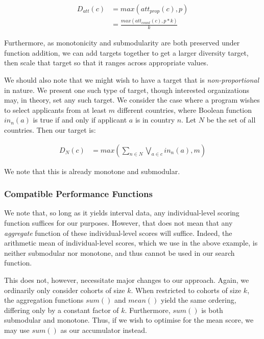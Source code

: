 \begin{equation}
    \begin{split}
        D_{att}(c) &= max(att_{prop}(c), p) \\
        &= \frac{max(att_{count}(c), p*k)}{k}
    \end{split}
\end{equation}

Furthermore, as monotonicity and submodularity are both preserved under function addition, we can add targets together to get a larger diversity target, then scale that target so that it ranges across appropriate values.

We should also note that we might wish to have a target that is \textit{non-proportional} in nature. We present one such type of target, though interested organizations may, in theory, set any such target. We consider the case where a program wishes to select applicants from at least $m$ different countries, where Boolean function $in_n(a)$ is true if and only if applicant $a$ is in country $n$. Let $N$ be the set of all countries. Then our target is:

\begin{equation}
    \begin{split}
        D_N(c) &= max(\sum_{n \in N} \bigvee_{a \in c} in_n(a), m)
    \end{split}
\end{equation}

We note that this is already monotone and submodular.

\subsubsection{Compatible Performance Functions}
We note that, so long as it yields interval data, any individual-level scoring function suffices for our purposes. However, that does not mean that any \textit{aggregate} function of these individual-level scores will suffice. Indeed, the arithmetic mean of individual-level scores, which we use in the above example, is neither submodular nor monotone, and thus cannot be used in our search function.

This does not, however, necessitate major changes to our approach. Again, we ordinarily only consider cohorts of size $k$. When restricted to cohorts of size $k$, the aggregation functions $sum()$ and $mean()$ yield the same ordering, differing only by a constant factor of $k$. Furthermore, $sum()$ is both submodular and monotone. Thus, if we wish to optimise for the mean score, we may use $sum()$ as our accumulator instead.

